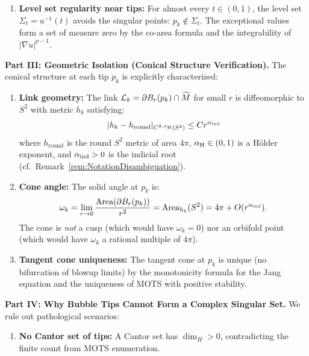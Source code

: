 \begin{proposition}
\begin{enumerate}
    \item \textbf{Level set regularity near tips:} For almost every $t \in (0,1)$, the level set $\Sigma_t = u^{-1}(t)$ avoids the singular points: $p_k \notin \Sigma_t$. The exceptional values form a set of measure zero by the co-area formula and the integrability of $|\nabla u|^{p-1}$.
\end{enumerate}

\textbf{Part III: Geometric Isolation (Conical Structure Verification).}
The conical structure at each tip $p_k$ is explicitly characterized:

\begin{enumerate}
    \item \textbf{Link geometry:} The link $\mathcal{L}_k = \partial B_r(p_k) \cap \widetilde{M}$ for small $r$ is diffeomorphic to $S^2$ with metric $h_k$ satisfying:
    \begin{equation}
        |h_k - h_{\text{round}}|_{C^{2,\alpha_{\mathrm{H}}}(S^2)} \le C r^{\alpha_{\mathrm{ind}}}
    \end{equation}
    where $h_{\text{round}}$ is the round $S^2$ metric of area $4\pi$, $\alpha_{\mathrm{H}} \in (0,1)$ is a H\"older exponent, and $\alpha_{\mathrm{ind}} > 0$ is the indicial root (cf.\ Remark~\ref{rem:NotationDisambiguation}).
    
    \item \textbf{Cone angle:} The solid angle at $p_k$ is:
    \begin{equation}
        \omega_k = \lim_{r \to 0} \frac{\text{Area}(\partial B_r(p_k))}{r^2} = \text{Area}_{h_k}(S^2) = 4\pi + O(r^{\alpha_{\mathrm{ind}}}).
    \end{equation}
    The cone is \emph{not} a cusp (which would have $\omega_k = 0$) nor an orbifold point (which would have $\omega_k$ a rational multiple of $4\pi$).
    
    \item \textbf{Tangent cone uniqueness:} The tangent cone at $p_k$ is unique (no bifurcation of blowup limits) by the monotonicity formula for the Jang equation and the uniqueness of MOTS with positive stability.
\end{enumerate}

\textbf{Part IV: Why Bubble Tips Cannot Form a Complex Singular Set.}
We rule out pathological scenarios:

\begin{enumerate}
    \item \textbf{No Cantor set of tips:} A Cantor set has $\dim_H > 0$, contradicting the finite count from MOTS enumeration.
    

\end{enumerate}
\end{proposition}

